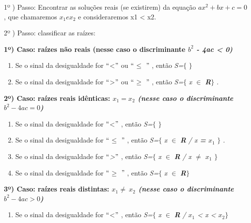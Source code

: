 \begin{caixa}

1º ) Passo: Encontrar as soluções reais (se existirem) da equação $ax^{2} + bx + c = 0$, que chamaremos $x_{1} e  x_{2}$ e consideraremos x1 < x2.

2º ) Passo: classificar as raízes:

\textbf{1º) Caso: raízes não reais (nesse caso o discriminante \textit{$b^{2}$ - 4ac < 0) }}

\begin{enumerate}
	\item Se o sinal da desigualdade for $``$<$"$  ou $``$\textit{$ \leq $ }$"$ , então \textit{S=}$ \{ $ $ \} $ 

	\item Se o sinal da desigualdade for $``$>$"$  ou $``$$ \geq $ $"$ , então \textit{S=}$ \{ $ \textit{x $\in$ } \textbf{\textit{R}}$ \} $ \textit{.}
\end{enumerate}

\textbf{2º) Caso: raízes reais idênticas: \textit{$x_{1} = x_{2}$ (nesse caso o discriminante $b^{2} - 4ac  = 0$) }}

\begin{enumerate}
	\item Se o sinal da desigualdade for $``$<$"$ , então \textit{S=}$ \{ $ $ \} $ 

	\item Se o sinal da desigualdade for $``$\textit{$ \leq $ }$"$ , então \textit{S=}$ \{ $ \textit{x $\in$ } \textbf{\textit{R }}\textit{/ x\textbf{ = }$x_{1}$} $ \} $ \textit{.}

	\item \textit{ }Se o sinal da desigualdade for $``$\textit{>}$"$ , então \textit{S=}$ \{ $ \textit{x $\in$ } \textbf{\textit{R }}\textit{/ x\textbf{ $ \neq $  }$x_{1}$} $ \} $ 

	\item  Se o sinal da desigualdade for $``$\textit{$ \geq $ }$"$ , então \textit{S=}$ \{ $ \textit{x $\in$ } \textbf{\textit{R}}$ \} $ 
\end{enumerate}

\textbf{3º) Caso: raízes reais distintas: \textit{$x_{1} \neq ~ x_{2}$ (nesse caso o discriminante $b^{2} - 4ac > 0$) }}

\begin{enumerate}
	\item Se o sinal da desigualdade for $``$<$"$ , então \textit{S=}$ \{ $ \textit{x $\in$ } \textbf{\textit{R }}\textit{/ $x_{1}$ < x < $x_{2}$}$ \} $ 


\end{enumerate}
\end{caixa}
